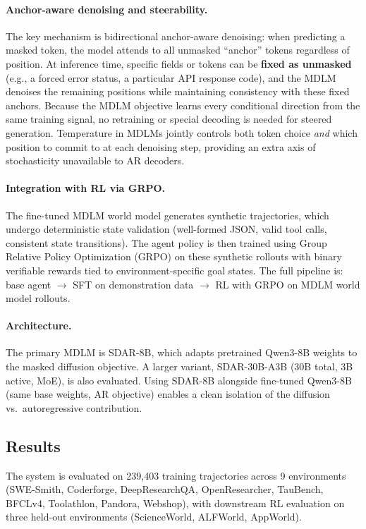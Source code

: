 \documentclass[11pt,a4paper]{article}
\begin{document}
\paragraph{Anchor-aware denoising and steerability.}
The key mechanism is bidirectional anchor-aware denoising: when predicting a masked token, the model attends to all unmasked ``anchor'' tokens regardless of position. At inference time, specific fields or tokens can be \textbf{fixed as unmasked} (e.g., a forced error status, a particular API response code), and the MDLM denoises the remaining positions while maintaining consistency with these fixed anchors. Because the MDLM objective learns every conditional direction from the same training signal, no retraining or special decoding is needed for steered generation. Temperature in MDLMs jointly controls both token choice \emph{and} which position to commit to at each denoising step, providing an extra axis of stochasticity unavailable to AR decoders.

\paragraph{Integration with RL via GRPO.}
The fine-tuned MDLM world model generates synthetic trajectories, which undergo deterministic state validation (well-formed JSON, valid tool calls, consistent state transitions). The agent policy is then trained using Group Relative Policy Optimization (GRPO) on these synthetic rollouts with binary verifiable rewards tied to environment-specific goal states. The full pipeline is: base agent $\to$ SFT on demonstration data $\to$ RL with GRPO on MDLM world model rollouts.

\paragraph{Architecture.}
The primary MDLM is SDAR-8B, which adapts pretrained Qwen3-8B weights to the masked diffusion objective. A larger variant, SDAR-30B-A3B (30B total, 3B active, MoE), is also evaluated. Using SDAR-8B alongside fine-tuned Qwen3-8B (same base weights, AR objective) enables a clean isolation of the diffusion vs.\ autoregressive contribution.

\subsection{Results}

The system is evaluated on 239,403 training trajectories across 9 environments (SWE-Smith, Coderforge, DeepResearchQA, OpenResearcher, TauBench, BFCLv4, Toolathlon, Pandora, Webshop), with downstream RL evaluation on three held-out environments (ScienceWorld, ALFWorld, AppWorld).
\end{document}
